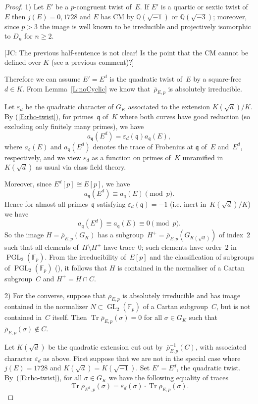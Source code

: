 \documentclass[12pt, reqno]{amsart}
\newcommand{\F}{\mathbb{F}}
\newcommand{\Q}{\mathbb{Q}}
\newcommand{\rhobar}{{\overline{\rho}}}
\newcommand{\frq}{{\mathfrak q}}
\newcommand{\eps}{\varepsilon}
\DeclareMathOperator{\Tr}{Tr}
\newcommand{\GL}{\operatorname{GL}}
\newcommand{\PGL}{\operatorname{PGL}}
\numberwithin{equation}{section}
\theoremstyle{definition}
\theoremstyle{remark}
\newcommand{\jc}[1]{{\color{darkgreen} \textsf{[JC: #1]}}}
\begin{document}
\begin{proof} 1) Let $E'$ be a $p$-congruent twist of~$E$. If $E'$ is a quartic or sextic twist of~$E$ then $j(E)=0,1728$ and 
$E$ has CM by $\Q(\sqrt{-1})$ or $\Q(\sqrt{-3})$; moreover, since $p > 3$ the image is well known to be irreducible and projectively isomorphic to $D_n$ for $n \geq 2$. 

\jc{The previous half-sentence is not clear!  Is the point that the CM
cannot be defined over $K$ (see a previous comment)?}
  
Therefore we can assume $E' = E^d$ 
is the quadratic twist of~$E$ by a square-free $d\in K$.
From Lemma~\ref{L:noCyclic} we know that~$\rhobar_{E,p}$ is absolutely irreducible. 

Let $\eps_d$ be the quadratic character of $G_K$ associated to the
extension $K(\sqrt{d})/K$. By (\ref{E:rho-twist}), for primes~$\frq$
of~$K$ where both curves have good reduction (so excluding only
finitely many primes), we have
\[
  a_\frq(E^d) = \eps_d(\frq) a_\frq(E),
\]
where $a_\frq(E)$ and $a_\frq(E^d)$ denotes the trace of Frobenius at
$\frq$ of~$E$ and~$E^d$, respectively, and we view $\eps_d$ as a
function on primes of~$K$ unramified in~$K(\sqrt{d})$ as usual via
class field theory.
  
Moreover, since $E^d[p]\cong
  E[p]$, we have
  \[
  a_\frq(E^d) \equiv a_\frq(E) \pmod{p}.
  \]
  Hence for almost all primes~$\frq$ satisfying $\eps_d(\frq) = -1$ (i.e. inert
  in~$K(\sqrt{d})/K$) we have
  \[
  a_\frq(E^d) \equiv a_\frq(E) \equiv0 \pmod{p}.
  \]
  So the image $H=\rhobar_{E,p}(G_K)$ has a
  subgroup~$H^+=\rhobar_{E,p}(G_{K(\sqrt{d})})$ of index~$2$ such that
  all elements of~$H\setminus H^+$ have trace~$0$;  such elements have
  order~$2$ in $\PGL_2(\F_p)$. From the
  irreducibility of~$E[p]$ and the classification of subgroups of $\PGL_2(\F_p)$ (\cite[Theorem XI.2.3]{LangModForms}), it follows that $H$ is contained in the
  normaliser of a Cartan subgroup~$C$ and $H^+=H\cap C$.

2) For the converse, suppose that $\rhobar_{E,p}$ is absolutely irreducible and has image contained in
the normalizer $N \subset \GL_2(\F_p)$ of a Cartan subgroup~$C$, but
is not contained in~$C$ itself. Then $\Tr \rhobar_{E,p}(\sigma) = 0$
for all $\sigma \in G_K$ such that $\rhobar_{E,p}(\sigma) \not\in C$.

Let $K(\sqrt{d})$ be the quadratic extension cut out
by~$\rhobar_{E,p}^{-1}(C)$, with associated character $\eps_d$ as
above.  First suppose that we are not in the special case where
$j(E)=1728$ and $K(\sqrt{d})=K(\sqrt{-1})$.  Set $E'=E^d$, the
quadratic twist.  By~(\ref{E:rho-twist}), for all $\sigma \in G_K$ we
have the following equality of traces
\[\Tr \rhobar_{{E^d},p}(\sigma) = \eps_d(\sigma) \cdot \Tr \rhobar_{E,p}(\sigma).\]


\end{proof}
\end{document}
